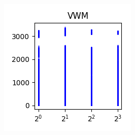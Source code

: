 \documentclass[sigconf,authorversion]{acmart}
\begin{document}
\begin{figure}[hbtp]
\begin{subfigure}[b]{0.3\textwidth}
        \label{fig:kwi}
    \end{subfigure}
    \begin{subfigure}[b]{0.3\textwidth}
        \includegraphics[width=\textwidth]{img/VWM.png}
        \label{fig:vwm}
    \end{subfigure}
\end{figure}
\end{document}
